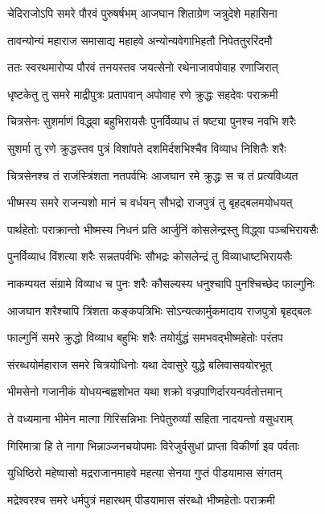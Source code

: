 \twolineshloka
{चेदिराजोऽपि समरे पौरवं पुरुषर्षभम्}
{आजघान शिताग्रेण जत्रुदेशे महासिना}


\twolineshloka
{तावन्योन्यं महाराज समासाद्य महाहवे}
{अन्योन्यवेगाभिहतौ निपेततुररिंदमौ}


\twolineshloka
{ततः स्वरथमारोप्य पौरवं तनयस्तव}
{जयत्सेनो रथेनाजावपोवाह रणाजिरात्}


\twolineshloka
{धृष्टकेतु तु समरे माद्रीपुत्रः प्रतापवान्}
{अपोवाह रणे क्रुद्धः सहदेवः पराक्रमी}


\twolineshloka
{चित्रसेनः सुशर्माणं विद्ध्वा बहुभिरायसैः}
{पुनर्विव्याध तं षष्ट्या पुनश्च नवभि शरैः}


\twolineshloka
{सुशर्मा तु रणे क्रुद्धस्तव पुत्रं विशांपते}
{दशमिर्दशभिश्चैव विव्याध निशितैः शरैः}


\twolineshloka
{चित्रसेनश्च तं राजंस्त्रिंशता नतपर्वभिः}
{आजघान रमे क्रुद्धः स च तं प्रत्यविध्यत}


\twolineshloka
{भीष्मस्य समरे राजन्यशो मानं च वर्धयन्}
{सौभद्रो राजपुत्रं तु बृहद्बलमयोधयत्}


\twolineshloka
{पार्थहेतोः पराक्रान्तो भीष्मस्य निधनं प्रति}
{आर्जुनिं कोसलेन्द्रस्तु विद्ध्वा पञ्चभिरायसैः}


\twolineshloka
{पुनर्विव्याध विंशत्या शरैः सन्नतपर्वभिः}
{सौभद्रः कोसलेन्द्रं तु विव्याधाष्टभिरायसैः}


\twolineshloka
{नाकम्पयत संग्रामे विव्याध च पुनः शरैः}
{कौसल्यस्य धनुश्चापि पुनश्चिच्छेद फाल्गुनिः}


\twolineshloka
{आजघान शरैश्चापि त्रिंशता कङ्कपत्रिभिः}
{सोऽन्यत्कार्मुकमादाय राजपुत्रो बृहद्बलः}


\twolineshloka
{फाल्गुनिं समरे क्रुद्धो विव्याध बहुभिः शरैः}
{तयोर्युद्धं समभवद्भीष्महेतोः परंतप}


\twolineshloka
{संरब्धयोर्महाराज समरे चित्रयोधिनोः}
{यथा देवासुरे युद्धे बलिवासवयोरभूत्}


\twolineshloka
{भीमसेनो गजानीकं योधयन्बह्वशोभत}
{यथा शक्रो वज्रपाणिर्दारयन्पर्वतोत्तमान्}


\twolineshloka
{ते वध्यमाना भीमेन मात्गा गिरिसन्निभाः}
{निपेतुरुर्व्यां सहिता नादयन्तो वसुधराम्}


\twolineshloka
{गिरिमात्रा हि ते नागा भिन्नाञ्जनचयोपमाः}
{विरेजुर्वसुधां प्राप्ता विकीर्णा इव पर्वताः}


\twolineshloka
{युधिष्ठिरो महेष्वासो मद्रराजानमाहवे}
{महत्या सेनया गुप्तं पीडयामास संगतम्}


\twolineshloka
{मद्रेश्वरश्च समरे धर्मपुत्रं महारथम्}
{पीडयामास संरब्धो भीष्महेतोः पराक्रमी}


